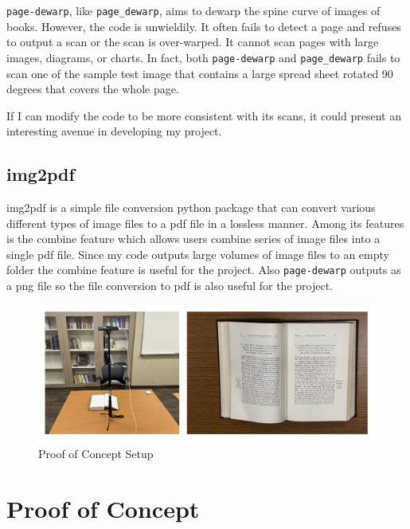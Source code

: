\documentclass[10pt,twocolumn]{article}
\begin{document}
\texttt{page-dewarp}, like \texttt{page\_dewarp}, aims to dewarp the spine curve of images of books. However, the code is unwieldily. It often fails to detect a page and refuses to output a scan or the scan is over-warped. It cannot scan pages with large images, diagrams, or charts. In fact, both \texttt{page-dewarp} and \texttt{page\_dewarp} fails to scan one of the sample test image that contains a large spread sheet rotated 90 degrees that covers the whole page. \newline

If I can modify the code to be more consistent with its scans, it could present an interesting avenue in developing my project. \newline

\subsection{img2pdf}
img2pdf is a simple file conversion python package that can convert various different types of image files to a pdf file in a lossless manner. Among its features is the combine feature which allows users combine series of image files into a single pdf file. Since my code outputs large volumes of image files to an empty folder the combine feature is useful for the project. Also \texttt{page-dewarp} outputs as a png file so the file conversion to pdf is also useful for the project.\newline

\begin{figure}
    \centering
    \includegraphics[width=1\linewidth]{mySetup.png}
    \caption{Proof of Concept Setup}
    \label{fig:enter-label}
\end{figure}


\section{Proof of Concept}
\newline
\end{document}
